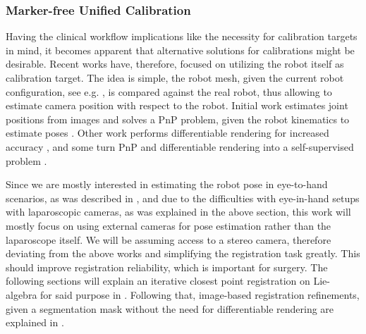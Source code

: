 \subsubsection{Marker-free Unified Calibration}
Having the clinical workflow implications like the necessity for calibration targets in mind, it becomes apparent that alternative solutions for calibrations might be desirable. Recent works have, therefore, focused on utilizing the robot itself as calibration target. The idea is simple, the robot mesh, given the current robot configuration, see e.g. , is compared against the real robot, thus allowing to estimate camera position with respect to the robot. Initial work estimates joint positions from images and solves a PnP problem, given the robot kinematics to estimate poses \cite{labbe2021single}. Other work performs differentiable rendering for increased accuracy \cite{chen2023easy}, and some turn PnP and differentiable rendering into a self-supervised problem \cite{lu2023markerless}.

Since we are mostly interested in estimating the robot pose in eye-to-hand scenarios, as was described in , and due to the difficulties with eye-in-hand setups with laparoscopic cameras, as was explained in the above section, this work will mostly focus on using external cameras for pose estimation rather than the laparoscope itself. We will be assuming access to a stereo camera, therefore deviating from the above works and simplifying the registration task greatly. This should improve registration reliability, which is important for surgery. The following sections will explain an iterative closest point registration on Lie-algebra for said purpose in . Following that, image-based registration refinements, given a segmentation mask without the need for differentiable rendering are explained in .



